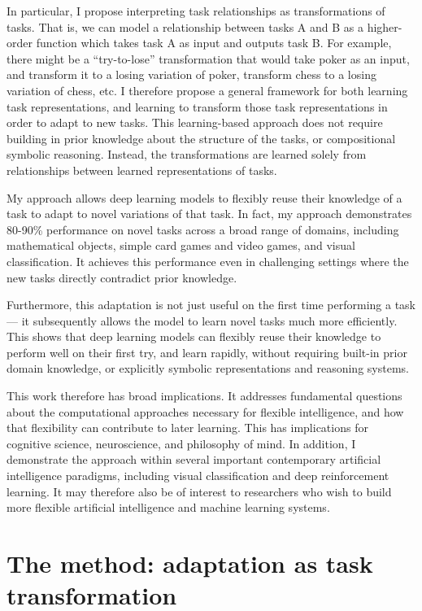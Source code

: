 \documentclass[12pt]{article}
\begin{document}
In particular, I propose interpreting task relationships as transformations of tasks. That is, we can model a relationship between tasks A and B as a higher-order function which takes task A as input and outputs task B. For example, there might be a ``try-to-lose'' transformation that would take poker as an input, and transform it to a losing variation of poker, transform chess to a losing variation of chess, etc. I therefore propose a general framework for both learning task representations, and learning to transform those task representations in order to adapt to new tasks. This learning-based approach does not require building in prior knowledge about the structure of the tasks, or compositional symbolic reasoning. Instead, the transformations are learned solely from relationships between learned representations of tasks. 

My approach allows deep learning models to flexibly reuse their knowledge of a task to adapt to novel variations of that task. In fact, my approach demonstrates 80-90\% performance on novel tasks across a broad range of domains, including mathematical objects, simple card games and video games, and visual classification. It achieves this performance even in challenging settings where the new tasks directly contradict prior knowledge. 

Furthermore, this adaptation is not just useful on the first time performing a task --- it subsequently allows the model to learn novel tasks much more efficiently. This shows that deep learning models can flexibly reuse their knowledge to perform well on their first try, and learn rapidly, without requiring built-in prior domain knowledge, or explicitly symbolic representations and reasoning systems. 

This work therefore has broad implications. It addresses fundamental questions about the computational approaches necessary for flexible intelligence, and how that flexibility can contribute to later learning. This has implications for cognitive science, neuroscience, and philosophy of mind. In addition, I demonstrate the approach within several important contemporary artificial intelligence paradigms, including visual classification and deep reinforcement learning. It may therefore also be of interest to researchers who wish to build more flexible artificial intelligence and machine learning systems.

\section{The method: adaptation as task transformation}
\end{document}
